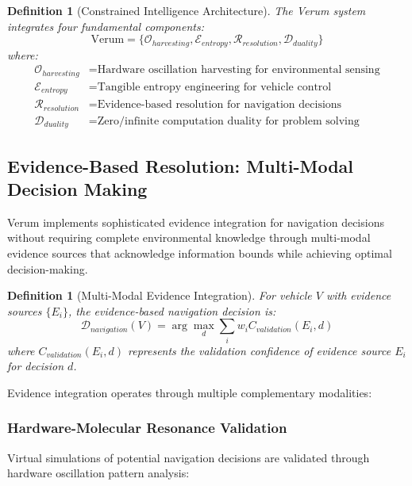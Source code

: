\documentclass[12pt,a4paper]{article}
\newtheorem{definition}[theorem]{Definition}
\begin{document}
\begin{definition}[Constrained Intelligence Architecture]
The Verum system integrates four fundamental components:
\begin{equation}
\text{Verum} = \{
    \mathcal{O}_{harvesting}, \mathcal{E}_{entropy}, \mathcal{R}_{resolution}, \mathcal{D}_{duality}
\}
\end{equation}
where:
\begin{align}
\mathcal{O}_{harvesting} &= \text{Hardware oscillation harvesting for environmental sensing} \\
\mathcal{E}_{entropy} &= \text{Tangible entropy engineering for vehicle control} \\
\mathcal{R}_{resolution} &= \text{Evidence-based resolution for navigation decisions} \\
\mathcal{D}_{duality} &= \text{Zero/infinite computation duality for problem solving}
\end{align}
\end{definition}


\subsection{Evidence-Based Resolution: Multi-Modal Decision Making}

Verum implements sophisticated evidence integration for navigation decisions without requiring complete environmental knowledge through multi-modal evidence sources that acknowledge information bounds while achieving optimal decision-making.

\begin{definition}[Multi-Modal Evidence Integration]
For vehicle $V$ with evidence sources $\{E_i\}$, the evidence-based navigation decision is:
\begin{equation}
\mathcal{D}_{navigation}(V) = \arg\max_{d} \sum_{i} w_i C_{validation}(E_i, d)
\end{equation}
where $C_{validation}(E_i, d)$ represents the validation confidence of evidence source $E_i$ for decision $d$.
\end{definition}

Evidence integration operates through multiple complementary modalities:

\subsubsection{Hardware-Molecular Resonance Validation}

Virtual simulations of potential navigation decisions are validated through hardware oscillation pattern analysis:
\end{document}
